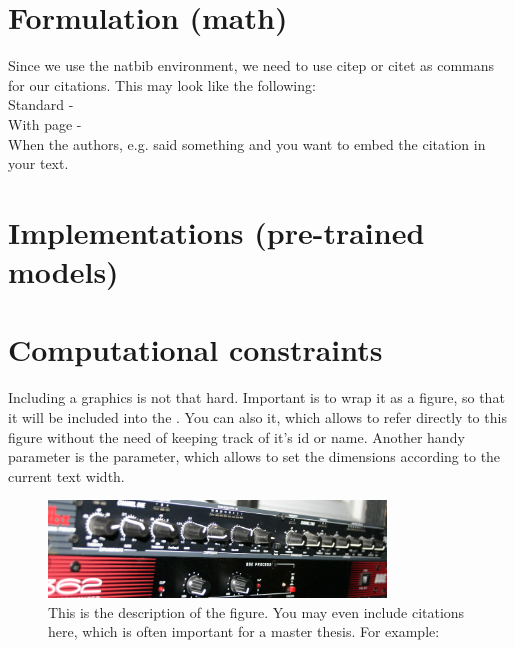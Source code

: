 \section{Formulation (math)}

Since we use the natbib environment, we need to use citep or citet as commans for our citations. This may look like the following:\\

Standard -  \citep{SkieThea2008} \citep{lombard} \citep{bendavid}\\

With page - \citep[p.123]{BernAnal2010}\\

When the authors, e.g. \citet{mayring2014} said something and you want to embed the citation in your text.

%
%
\newpage
\section{Implementations (pre-trained models)}


\section{Computational constraints}

Including a graphics is not that hard. Important is to wrap it as a figure, so that it will be included into the . You can also  it, which allows to refer directly to this figure without the need of keeping track of it's id or name. Another handy parameter is the  parameter, which allows to set the dimensions according to the current text width.

\begin{figure}[H]
\begin{center}
\includegraphics[width=0.8\textwidth]{media/amp.jpg}
\end{center}
\caption[Figure description for the table of content.]{This is the description of the figure. You may even include citations here, which is often important for a master thesis. For example: \citep{SkieThea2008}}
\end{figure}


